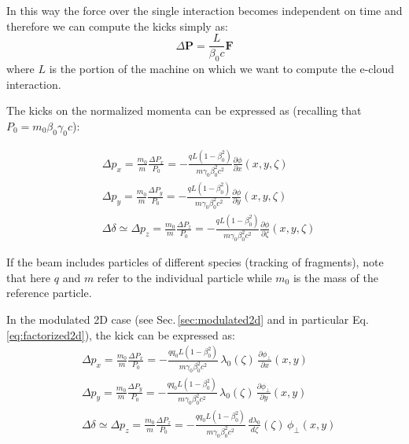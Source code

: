 In this way the force over the single interaction becomes independent on time and therefore we can compute the kicks simply as:
\begin{equation}
\Delta \textbf{P} = \frac{L}{\beta_0 c}\textbf{F} 
\end{equation}
where $L$ is the portion of the machine on which we want to compute the e-cloud interaction.

The kicks on the normalized momenta can be expressed as (recalling that $P_0=m_0\beta_0\gamma_0c$):

\begin{align}
&\boxed{
\Delta p_x = \frac{m_0}{m}\frac{\Delta P_x} {P_0}= -\frac{qL (1-\beta_0^2)}{ m\gamma_0\beta_0^2 c^2} \frac{\partial \phi}{\partial x}\left(x, y,\zeta\right)}\label{dpx}\\
&\boxed{
\Delta p_y = \frac{m_0}{m}\frac{\Delta P_y} {P_0}= -\frac{qL (1-\beta_0^2)}{ m\gamma_0\beta_0^2 c^2} \frac{\partial \phi}{\partial y}\left(x, y,\zeta\right)}\label{dpy}\\
&\boxed{
\Delta \delta \simeq \Delta p_z = \frac{m_0}{m}\frac{\Delta P_z} {P_0}= -\frac{qL (1-\beta_0^2)}{ m\gamma_0\beta_0^2 c^2} \frac{\partial \phi}{\partial \zeta}\left(x, y,\zeta\right)}
\label{dpz}
\end{align}

If the beam includes particles of different species (tracking of fragments), note that here $q$ and $m$ refer to the individual particle while $m_0$ is the mass of the reference particle.



In the modulated 2D case (see Sec.\,\ref{sec:modulated2d} and in particular Eq.\,\ref{eq:factorized2d}), the kick can be expressed as:
\begin{align}
&\boxed{
\Delta p_x = \frac{m_0}{m}\frac{\Delta P_x} {P_0}= -\frac{qq_0L (1-\beta_0^2)}{ m\gamma_0\beta_0^2 c^2} \,\lambda_0(\zeta)\,\frac{\partial {\phi_\perp}}{\partial x}\left(x, y\right)}\label{dpx_mod}\\
&\boxed{
\Delta p_y = \frac{m_0}{m}\frac{\Delta P_y} {P_0}= -\frac{qq_0L (1-\beta_0^2)}{ m\gamma_0\beta_0^2 c^2} \,\lambda_0(\zeta)\, \frac{\partial{\phi_\perp}}{\partial y}\left(x, y\right)}\label{dpy_mod}\\
&\boxed{
\Delta \delta \simeq \Delta p_z = \frac{ m_0} {m}\frac{\Delta P_z} {P_0}= -\frac{qq_0L (1-\beta_0^2)}{ m\gamma_0\beta_0^2 c^2} \,\frac{d\lambda_0}{d\zeta}(\zeta)\,{\phi_\perp}\left(x, y\right)}\label{dpz_mod}
\end{align}

